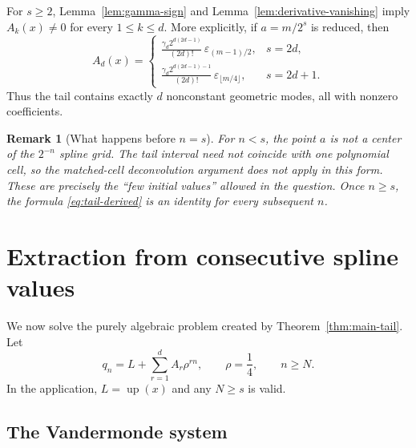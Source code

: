 \documentclass[11pt]{article}
\newtheorem{remark}[theorem]{Remark}
\newcommand{\upf}{\operatorname{up}}
\newcommand{\eps}{\varepsilon}
\begin{document}
For $s\ge2$, Lemma~\ref{lem:gamma-sign} and
Lemma~\ref{lem:derivative-vanishing} imply $A_k(x)\ne0$ for every
$1\le k\le d$.  More explicitly, if
$a=m/2^s$ is reduced, then
\begin{equation}
 A_d(x)=
 \begin{cases}
 \displaystyle
 \frac{\gamma_d2^{d(2d-1)}}{(2d)!}\,
 \eps_{(m-1)/2},&s=2d,\\[1.2em]
 \displaystyle
 \frac{\gamma_d2^{d(2d-1)-1}}{(2d)!}\,
 \eps_{\lfloor m/4\rfloor},&s=2d+1.
 \end{cases}
 \label{eq:top-coefficient}
\end{equation}
Thus the tail contains exactly $d$ nonconstant geometric modes, all with
nonzero coefficients.

\begin{remark}[What happens before $n=s$]
For $n<s$, the point $a$ is not a center of the $2^{-n}$ spline grid.  The
tail interval need not coincide with one polynomial cell, so the matched-cell
deconvolution argument does not apply in this form.  These are precisely the
``few initial values'' allowed in the question.  Once $n\ge s$, the formula
\eqref{eq:tail-derived} is an identity for every subsequent $n$.
\end{remark}

\section{Extraction from consecutive spline values}

We now solve the purely algebraic problem created by
Theorem~\ref{thm:main-tail}.  Let
\begin{equation}
 q_n=L+\sum_{r=1}^{d}A_r\rho^{rn},
 \qquad \rho=\frac14,
 \qquad n\ge N.
 \label{eq:abstract-tail}
\end{equation}
In the application, $L=\upf(x)$ and any $N\ge s$ is valid.

\subsection{The Vandermonde system}
\end{document}
